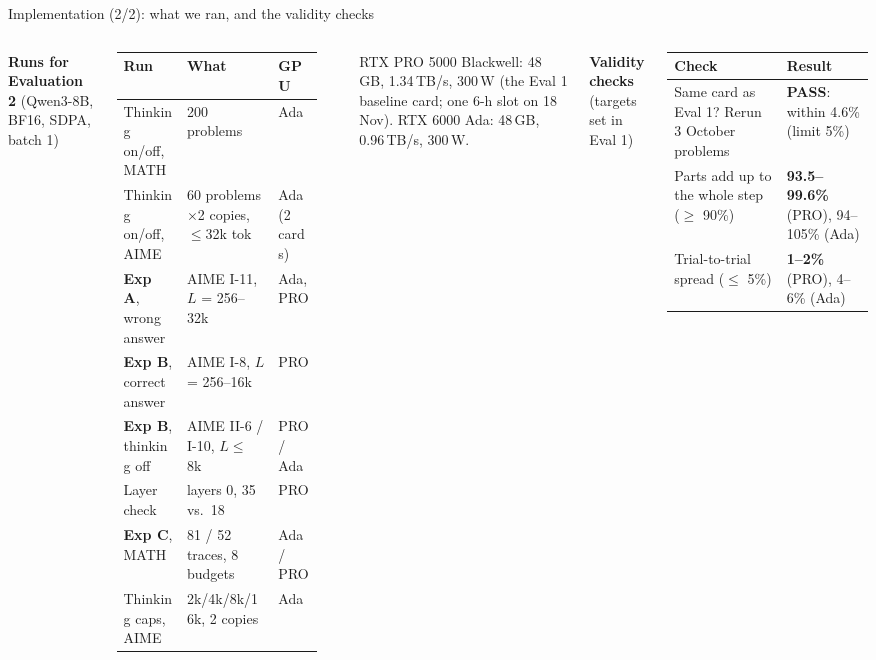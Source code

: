 \documentclass[aspectratio=169,9pt]{beamer}
\newcommand{\x}{$\times$}
\newcommand{\hd}[1]{{\color{accent}\bfseries #1}}
\begin{document}
\begin{frame}{Implementation (2/2): what we ran, and the validity checks}
  \begin{columns}[T,onlytextwidth]
    \hd{Runs for Evaluation 2} {\scriptsize\color{muted}(Qwen3-8B, BF16, SDPA, batch 1)}\\[2pt]
    \scriptsize
    \begin{tabular}{@{}L{0.33\textwidth}L{0.40\textwidth}L{0.21\textwidth}@{}}
      \toprule
      Run & What & GPU \\
      \midrule
      Thinking on/off, MATH & 200 problems & Ada \\
      Thinking on/off, AIME & 60 problems \x 2 copies, $\leq$32k tok & Ada (2 cards) \\
      \textbf{Exp A}, wrong answer & AIME I-11, $L$ = 256--32k & Ada, PRO \\
      \textbf{Exp B}, correct answer & AIME I-8, $L$ = 256--16k & PRO \\
      \textbf{Exp B}, thinking off & AIME II-6 / I-10, $L \leq$ 8k & PRO / Ada \\
      Layer check & layers 0, 35 vs.\ 18 & PRO \\
      \textbf{Exp C}, MATH & 81 / 52 traces, 8 budgets & Ada / PRO \\
      Thinking caps, AIME & 2k/4k/8k/16k, 2 copies & Ada \\
      \bottomrule
    \end{tabular}\\[3pt]
    {\tiny\color{muted}RTX PRO 5000 Blackwell: 48\,GB, 1.34\,TB/s, 300\,W (the Eval 1 baseline card; one 6-h slot on 18 Nov).
    RTX 6000 Ada: 48\,GB, 0.96\,TB/s, 300\,W.\par}
    \hd{Validity checks} {\scriptsize\color{muted}(targets set in Eval 1)}\\[2pt]
    \scriptsize
    \begin{tabular}{@{}L{0.50\textwidth}L{0.42\textwidth}@{}}
      \toprule
      Check & Result \\
      \midrule
      Same card as Eval 1? Rerun 3 October problems & {\color{good}\textbf{PASS}}: within 4.6\% (limit 5\%) \\
      Parts add up to the whole step ($\geq$ 90\%) & \textbf{93.5--99.6\%} (PRO), 94--105\% (Ada) \\
      Trial-to-trial spread ($\leq$ 5\%) & \textbf{1--2\%} (PRO), 4--6\% (Ada) \\

\end{tabular}
\end{columns}
\end{frame}
\end{document}
